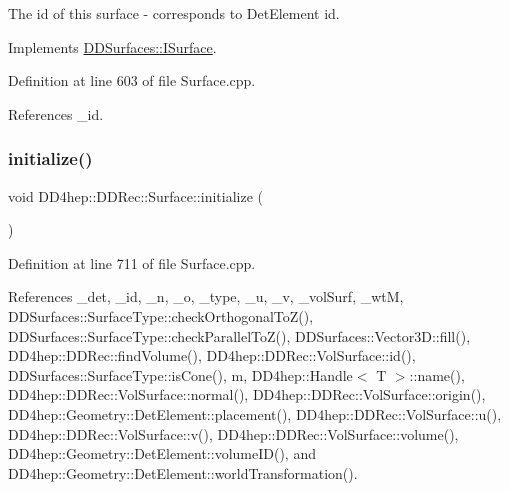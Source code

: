 The id of this surface -\/ corresponds to Det\+Element id. 



Implements \hyperlink{class_d_d_surfaces_1_1_i_surface_aaf7bf967d4a0652c620ec9754a2b37c1}{D\+D\+Surfaces\+::\+I\+Surface}.



Definition at line 603 of file Surface.\+cpp.



References \+\_\+id.

\hypertarget{class_d_d4hep_1_1_d_d_rec_1_1_surface_aeee7cc15facd37699acda7146f540fe1}{}\label{class_d_d4hep_1_1_d_d_rec_1_1_surface_aeee7cc15facd37699acda7146f540fe1} 
\subsubsection{\texorpdfstring{initialize()}{initialize()}}
{\footnotesize\ttfamily void D\+D4hep\+::\+D\+D\+Rec\+::\+Surface\+::initialize (\begin{DoxyParamCaption}{ }\end{DoxyParamCaption})\hspace{0.3cm}{\ttfamily [protected]}}



Definition at line 711 of file Surface.\+cpp.



References \+\_\+det, \+\_\+id, \+\_\+n, \+\_\+o, \+\_\+type, \+\_\+u, \+\_\+v, \+\_\+vol\+Surf, \+\_\+wtM, D\+D\+Surfaces\+::\+Surface\+Type\+::check\+Orthogonal\+To\+Z(), D\+D\+Surfaces\+::\+Surface\+Type\+::check\+Parallel\+To\+Z(), D\+D\+Surfaces\+::\+Vector3\+D\+::fill(), D\+D4hep\+::\+D\+D\+Rec\+::find\+Volume(), D\+D4hep\+::\+D\+D\+Rec\+::\+Vol\+Surface\+::id(), D\+D\+Surfaces\+::\+Surface\+Type\+::is\+Cone(), m, D\+D4hep\+::\+Handle$<$ T $>$\+::name(), D\+D4hep\+::\+D\+D\+Rec\+::\+Vol\+Surface\+::normal(), D\+D4hep\+::\+D\+D\+Rec\+::\+Vol\+Surface\+::origin(), D\+D4hep\+::\+Geometry\+::\+Det\+Element\+::placement(), D\+D4hep\+::\+D\+D\+Rec\+::\+Vol\+Surface\+::u(), D\+D4hep\+::\+D\+D\+Rec\+::\+Vol\+Surface\+::v(), D\+D4hep\+::\+D\+D\+Rec\+::\+Vol\+Surface\+::volume(), D\+D4hep\+::\+Geometry\+::\+Det\+Element\+::volume\+I\+D(), and D\+D4hep\+::\+Geometry\+::\+Det\+Element\+::world\+Transformation().



